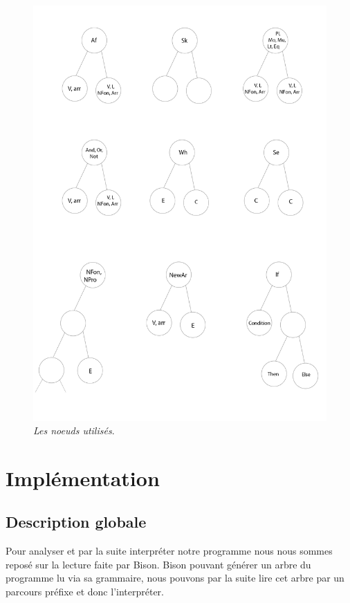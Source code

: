 \documentclass[10pt,a4paper]{article}
\begin{document}
\begin{figure}
\includegraphics[scale = 0.17]{compi.png}
\caption{\textit{Les noeuds utilisés}.}
\label{SchemaNoeuds}
\end{figure}
\newpage

\section{Implémentation}
\subsection{Description globale}
Pour analyser et par la suite interpréter notre programme nous nous sommes reposé sur la lecture faite par Bison.
Bison pouvant générer un arbre du programme lu via sa grammaire, nous pouvons par la suite lire cet arbre par un parcours préfixe et donc l'interpréter.
\end{document}

